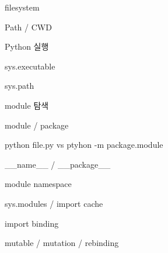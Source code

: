 \begin{dhksmry}[centered]
filesystem

\da

Path / CWD

\da

Python 실행

\da

sys.executable

\da

sys.path

\da

module 탐색

\da

module / package

\da

python file.py vs ptyhon -m package.module

\da

__name__ / __package__

\da

module namespace

\da

sys.modules / import cache

\da

import binding

\da

mutable / mutation / rebinding
\end{dhksmry}

